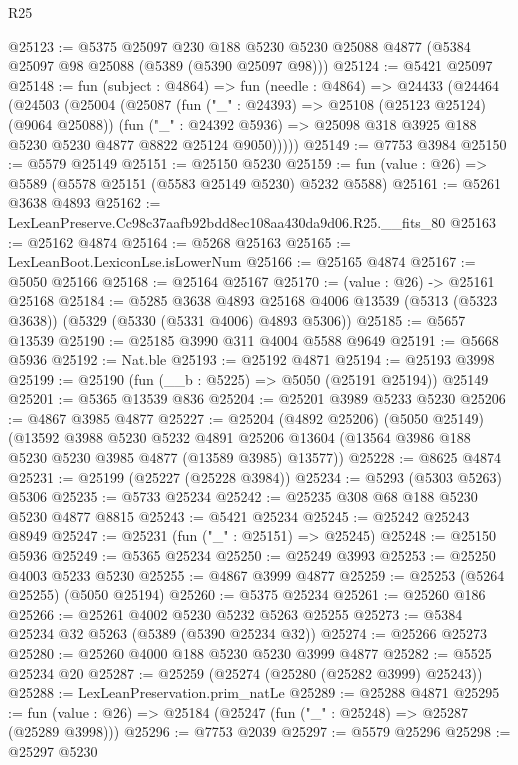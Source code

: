 \begin{lexlean}{R25}
\begin{coremodule}
@25123 := @5375
    @25097
    @230
    @188
    @5230
    @5230
    @25088
    @4877
    (@5384 @25097 @98 @25088 (@5389 (@5390 @25097 @98)))
@25124 := @5421 @25097
@25148 := fun (subject : @4864) =>
  fun (needle : @4864) =>
  @24433
    (@24464
      (@24503
        (@25004
          (@25087
            (fun ("_" : @24393) => @25108 (@25123 @25124) (@9064 @25088))
            (fun ("_" : @24392 @5936) =>
            @25098 @318 @3925 @188 @5230 @5230 @4877 @8822 @25124 @9050)))))
@25149 := @7753 @3984
@25150 := @5579 @25149
@25151 := @25150 @5230
@25159 := fun (value : @26) => @5589 (@5578 @25151 (@5583 @25149 @5230) @5232 @5588)
@25161 := @5261 @3638 @4893
@25162 := LexLeanPreserve.Cc98c37aafb92bdd8ec108aa430da9d06.R25.__fits_80
@25163 := @25162 @4874
@25164 := @5268 @25163
@25165 := LexLeanBoot.LexiconLse.isLowerNum
@25166 := @25165 @4874
@25167 := @5050 @25166
@25168 := @25164 @25167
@25170 := (value : @26) -> @25161 @25168
@25184 := @5285
    @3638
    @4893
    @25168
    @4006
    @13539
    (@5313 (@5323 @3638))
    (@5329 (@5330 (@5331 @4006) @4893 @5306))
@25185 := @5657 @13539
@25190 := @25185 @3990 @311 @4004 @5588 @9649
@25191 := @5668 @5936
@25192 := Nat.ble
@25193 := @25192 @4871
@25194 := @25193 @3998
@25199 := @25190 (fun (__b : @5225) => @5050 (@25191 @25194)) @25149
@25201 := @5365 @13539 @836
@25204 := @25201 @3989 @5233 @5230
@25206 := @4867 @3985 @4877
@25227 := @25204
    (@4892 @25206)
    (@5050 @25149)
    (@13592
      @3988
      @5230
      @5232
      @4891
      @25206
      @13604
      (@13564 @3986 @188 @5230 @5230 @3985 @4877 (@13589 @3985) @13577))
@25228 := @8625 @4874
@25231 := @25199 (@25227 (@25228 @3984))
@25234 := @5293 (@5303 @5263) @5306
@25235 := @5733 @25234
@25242 := @25235 @308 @68 @188 @5230 @5230 @4877 @8815
@25243 := @5421 @25234
@25245 := @25242 @25243 @8949
@25247 := @25231 (fun ("_" : @25151) => @25245)
@25248 := @25150 @5936
@25249 := @5365 @25234
@25250 := @25249 @3993
@25253 := @25250 @4003 @5233 @5230
@25255 := @4867 @3999 @4877
@25259 := @25253 (@5264 @25255) (@5050 @25194)
@25260 := @5375 @25234
@25261 := @25260 @186
@25266 := @25261 @4002 @5230 @5232 @5263 @25255
@25273 := @5384 @25234 @32 @5263 (@5389 (@5390 @25234 @32))
@25274 := @25266 @25273
@25280 := @25260 @4000 @188 @5230 @5230 @3999 @4877
@25282 := @5525 @25234 @20
@25287 := @25259 (@25274 (@25280 (@25282 @3999) @25243))
@25288 := LexLeanPreservation.prim_natLe
@25289 := @25288 @4871
@25295 := fun (value : @26) => @25184 (@25247 (fun ("_" : @25248) => @25287 (@25289 @3998)))
@25296 := @7753 @2039
@25297 := @5579 @25296
@25298 := @25297 @5230

\end{coremodule}
\end{lexlean}
